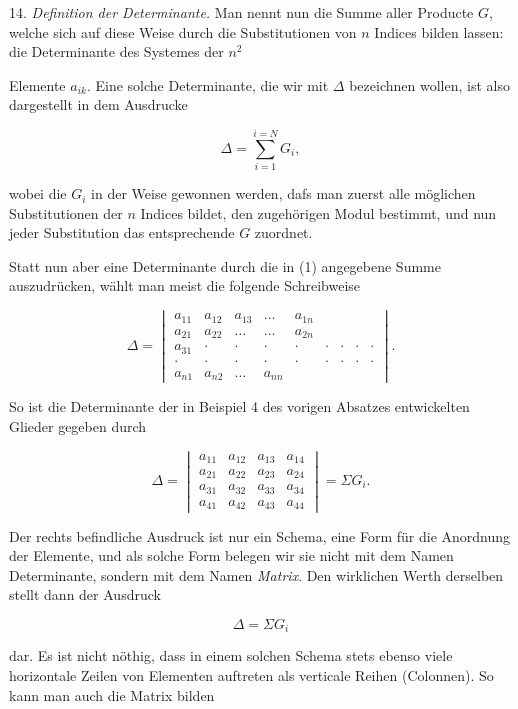 \documentclass[11pt]{article}
\providecommand{\weberpage}[1]{}
\providecommand{\weq}[2]{\begin{equation}\tag{#1}#2\end{equation}}
\let\Delta\varDelta
\let\Sigma\varSigma
\begin{document}
14. \textit{Definition der Determinante.} Man nennt nun die Summe aller Producte $G$, welche sich auf diese Weise durch die Substitutionen von $n$ Indices bilden lassen: die Determinante des Systemes der $n^2$


\weberpage{18}
Elemente $a_{ik}$. Eine solche Determinante, die wir mit $\Delta$ bezeichnen wollen, ist also dargestellt in dem Ausdrucke

\weq{1}{\Delta = \sum_{i=1}^{i=N} G_i,}

wobei die $G_i$ in der Weise gewonnen werden, dafs man zuerst alle möglichen Substitutionen der $n$ Indices bildet, den zugehörigen Modul bestimmt, und nun jeder Substitution das entsprechende $G$ zuordnet.

Statt nun aber eine Determinante durch die in (1) angegebene Summe auszudrücken, wählt man meist die folgende Schreibweise

\weq{2}{\Delta = \begin{vmatrix} a_{11} & a_{12} & a_{13} & \ldots & a_{1n} \\ a_{21} & a_{22} & \ldots & \ldots & a_{2n} \\ a_{31} & \cdot & \cdot & \cdot & \cdot & \cdot & \cdot & \cdot & \cdot \\ \cdot & \cdot & \cdot & \cdot & \cdot & \cdot & \cdot & \cdot & \cdot \\ a_{n1} & a_{n2} & \ldots & a_{nn} \end{vmatrix}.}

So ist die Determinante der in Beispiel 4 des vorigen Absatzes entwickelten Glieder gegeben durch

\weq{3}{\Delta = \begin{vmatrix} a_{11} & a_{12} & a_{13} & a_{14} \\ a_{21} & a_{22} & a_{23} & a_{24} \\ a_{31} & a_{32} & a_{33} & a_{34} \\ a_{41} & a_{42} & a_{43} & a_{44} \end{vmatrix} = \Sigma G_i.}

Der rechts befindliche Ausdruck ist nur ein Schema, eine Form für die Anordnung der Elemente, und als solche Form belegen wir sie nicht mit dem Namen Determinante, sondern mit dem Namen \textit{Matrix}. Den wirklichen Werth derselben stellt dann der Ausdruck

\weq{1}{\Delta = \Sigma G_i}

dar. Es ist nicht nöthig, dass in einem solchen Schema stets ebenso viele horizontale Zeilen von Elementen auftreten als verticale Reihen (Colonnen). So kann man auch die Matrix bilden
\end{document}
